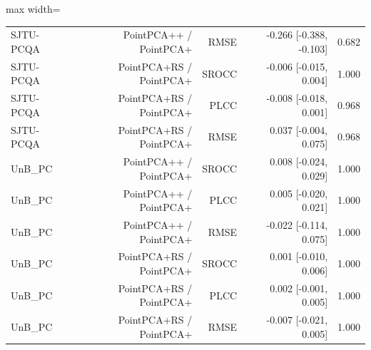 \begin{table}[t!]
\begin{adjustbox}{max width=\textwidth}
\begin{tabular}{lrrrr}
SJTU-PCQA & PointPCA++ / PointPCA+ & RMSE & -0.266 [-0.388, -0.103] & 0.682 \\
SJTU-PCQA & PointPCA+RS / PointPCA+ & SROCC & -0.006 [-0.015, 0.004] & 1.000 \\
SJTU-PCQA & PointPCA+RS / PointPCA+ & PLCC & -0.008 [-0.018, 0.001] & 0.968 \\
SJTU-PCQA & PointPCA+RS / PointPCA+ & RMSE & 0.037 [-0.004, 0.075] & 0.968 \\
UnB\_PC & PointPCA++ / PointPCA+ & SROCC & 0.008 [-0.024, 0.029] & 1.000 \\
UnB\_PC & PointPCA++ / PointPCA+ & PLCC & 0.005 [-0.020, 0.021] & 1.000 \\
UnB\_PC & PointPCA++ / PointPCA+ & RMSE & -0.022 [-0.114, 0.075] & 1.000 \\
UnB\_PC & PointPCA+RS / PointPCA+ & SROCC & 0.001 [-0.010, 0.006] & 1.000 \\
UnB\_PC & PointPCA+RS / PointPCA+ & PLCC & 0.002 [-0.001, 0.005] & 1.000 \\
UnB\_PC & PointPCA+RS / PointPCA+ & RMSE & -0.007 [-0.021, 0.005] & 1.000 \\
\bottomrule
\end{tabular}
\end{adjustbox}
\end{table}
